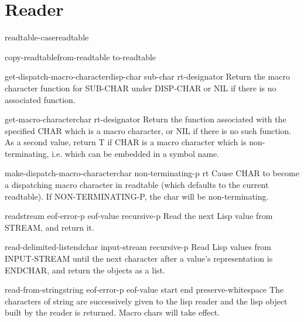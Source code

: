 \section{Reader}

\begin{accessor}{readtable-case}{readtable}
  
\end{accessor}

\begin{function}{copy-readtable}{\op from-readtable to-readtable}
  
\end{function}

\begin{function}{get-dispatch-macro-character}{disp-char sub-char \op rt-designator}
  Return the macro character function for SUB-CHAR under DISP-CHAR
   or NIL if there is no associated function.
\end{function}

\begin{function}{get-macro-character}{char \op rt-designator}
  Return the function associated with the specified CHAR which is a macro
  character, or NIL if there is no such function. As a second value, return
  T if CHAR is a macro character which is non-terminating, i.e. which can
  be embedded in a symbol name.
\end{function}

\begin{function}{make-dispatch-macro-character}{char \op non-terminating-p rt}
  Cause CHAR to become a dispatching macro character in readtable (which
   defaults to the current readtable). If NON-TERMINATING-P, the char will
   be non-terminating.
\end{function}

\begin{function}{read}{\op stream eof-error-p eof-value recursive-p}
  Read the next Lisp value from STREAM, and return it.
\end{function}

\begin{function}{read-delimited-list}{endchar \op input-stream recursive-p}
  Read Lisp values from INPUT-STREAM until the next character after a
   value's representation is ENDCHAR, and return the objects as a list.
\end{function}

\begin{function}{read-from-string}{string \op eof-error-p eof-value \key start end preserve-whitespace}
  The characters of string are successively given to the lisp reader
   and the lisp object built by the reader is returned. Macro chars
   will take effect.
\end{function}

